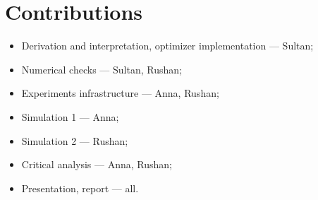 \section{Contributions}

\begin{itemize}
    \item Derivation and interpretation, optimizer implementation --- Sultan;
    \item Numerical checks --- Sultan, Rushan;
    \item Experiments infrastructure --- Anna, Rushan;
    \item Simulation 1 --- Anna;
    \item Simulation 2 --- Rushan;
    \item Critical analysis --- Anna, Rushan;
    \item Presentation, report --- all.
\end{itemize}
